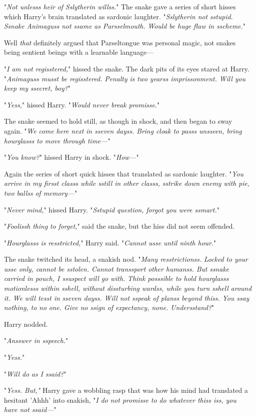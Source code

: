"\emph{Not unlesss heir of Sslytherin willss.}" The snake gave a series of short hisses which Harry's brain translated as sardonic laughter. "\emph{Sslytherin not sstupid. Ssnake Animaguss not ssame as Parsselmouth. Would be huge flaw in sscheme.}"

Well \emph{that} definitely argued that Parseltongue was personal magic, not snakes being sentient beings with a learnable language---

"\emph{I am not regisstered,}" hissed the snake. The dark pits of its eyes stared at Harry. "\emph{Animaguss musst be regisstered. Penalty is two yearss imprissonment. Will you keep my ssecret, boy?}"

"\emph{Yess,}" hissed Harry. "\emph{Would never break promisse.}"

The snake seemed to hold still, as though in shock, and then began to sway again. "\emph{We come here next in sseven dayss. Bring cloak to passs unsseen, bring hourglasss to move through time---}"

"\emph{You know?}" hissed Harry in shock. "\emph{How---}"

Again the series of short quick hisses that translated as sardonic laughter. "\emph{You arrive in my firsst classs while sstill in other classs, sstrike down enemy with pie, two ballss of memory---}"

"\emph{Never mind,}" hissed Harry. "\emph{Sstupid question, forgot you were ssmart.}"

"\emph{Foolissh thing to forget,}" said the snake, but the hiss did not seem offended.

"\emph{Hourglasss is resstricted,}" Harry said. "\emph{Cannot usse until ninth hour.}"

The snake twitched its head, a snakish nod. "\emph{Many resstrictionss. Locked to your usse only, cannot be sstolen. Cannot transsport other humanss. But ssnake carried in pouch, I ssuspect will go with. Think posssible to hold hourglasss motionlesss within sshell, without dissturbing wardss, while you turn sshell around it. We will tesst in sseven dayss. Will not sspeak of planss beyond thiss. You ssay nothing, to no one. Give no ssign of expectancy, none. Undersstand?}"

Harry nodded.

"\emph{Ansswer in sspeech.}"

"\emph{Yess.}"

"\emph{Will do as I ssaid?}"

"\emph{Yess. But,"} Harry gave a wobbling rasp that was how his mind had translated a hesitant 'Ahhh' into snakish, "\emph{I do not promisse to do whatever thiss iss, you have not ssaid---}"

